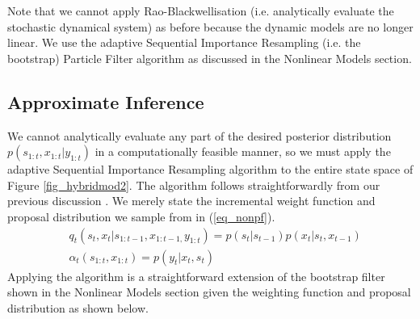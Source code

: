 Note that we cannot apply Rao-Blackwellisation (i.e. analytically evaluate the stochastic dynamical system) as before because the dynamic models are no longer linear. We use the adaptive Sequential Importance Resampling (i.e. the bootstrap) Particle Filter algorithm as discussed in the Nonlinear Models section.

\subsection{Approximate Inference}
We cannot analytically evaluate any part of the desired posterior distribution $p(s_{1:t}, x_{1:t}|y_{1:t})$ in a computationally feasible manner, so we must apply the adaptive Sequential Importance Resampling algorithm to the entire state space of Figure \ref{fig_hybridmod2}. The algorithm follows straightforwardly from our previous discussion \cite{murphy1}. We merely state the incremental weight function and proposal distribution we sample from in (\ref{eq_nonpf}). 
\begin{equation}
\begin{aligned}
&q_t(s_t,x_t|s_{1:t-1},x_{1:t-1,}y_{1:t}) = p(s_t|s_{t-1})p(x_t|s_t,x_{t-1}) \\
&\alpha_t(s_{1:t},x_{1:t}) = p(y_t|x_t,s_t)
\end{aligned}
\label{eq_nonpf}
\end{equation}  
Applying the algorithm is a straightforward extension of the bootstrap filter shown in the Nonlinear Models section given the weighting function and proposal distribution as shown below.


